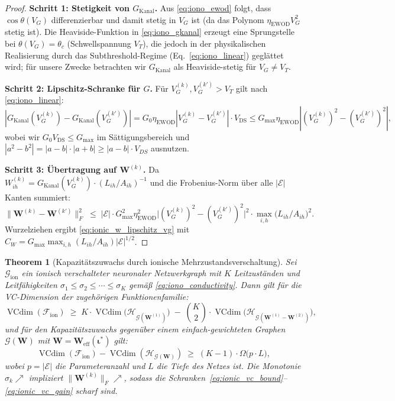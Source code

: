 \documentclass[12pt, a4paper, openany]{report}
\newtheorem{theorem}{Theorem}[chapter]
\newcommand{\calG}{\mathcal{G}}
\newcommand{\calH}{\mathcal{H}}
\newcommand{\calE}{\mathcal{E}}
\newcommand{\calF}{\mathcal{F}}
\DeclareMathOperator{\VC}{VCdim}
\begin{document}
\begin{proof}
\textbf{Schritt 1: Stetigkeit von $G_{\mathrm{Kanal}}$.}
Aus \eqref{eq:iono_ewod} folgt, dass $\cos\theta(V_G)$ differenzierbar
und damit stetig in $V_G$ ist (da das Polynom $\eta_{\mathrm{EWOD}} V_G^2$
stetig ist).  Die Heaviside-Funktion in \eqref{eq:iono_gkanal} erzeugt
eine Sprungstelle bei $\theta(V_G) = \theta_c$ (Schwellspannung $V_T$),
die jedoch in der physikalischen Realisierung durch das Subthreshold-Regime
(Eq.~\ref{eq:iono_linear}) geglättet wird; für unsere Zwecke betrachten
wir $G_{\mathrm{Kanal}}$ als Heaviside-stetig für $V_G \neq V_T$.

\textbf{Schritt 2: Lipschitz-Schranke für $G$.}
Für $V_G^{(k)}, V_G^{(k')} > V_T$ gilt nach \eqref{eq:iono_linear}:
\[
  |G_{\mathrm{Kanal}}(V_G^{(k)}) - G_{\mathrm{Kanal}}(V_G^{(k')})| 
  = G_0 \eta_{\mathrm{EWOD}} |V_G^{(k)} - V_G^{(k')}| \cdot V_\mathrm{DS}
  \leq G_{\max} \eta_{\mathrm{EWOD}} |(V_G^{(k)})^2 - (V_G^{(k')})^2|,
\]
wobei wir $G_0 V_\mathrm{DS} \leq G_{\max}$ im Sättigungsbereich
und $|a^2 - b^2| = |a-b| \cdot |a+b| \geq |a-b| \cdot V_{DS}$ ausnutzen.

\textbf{Schritt 3: Übertragung auf $\bm{W}^{(k)}$.}
Da $W^{(k)}_{ih} = G_{\mathrm{Kanal}}(V_G^{(k)}) \cdot (L_{ih}/A_{ih})^{-1}$
und die Frobenius-Norm über alle $|\calE|$ Kanten summiert:
\[
  \|\bm{W}^{(k)} - \bm{W}^{(k')}\|_F^2
  \;\leq\;
  |\calE| \cdot G_{\max}^2 \eta_{\mathrm{EWOD}}^2
  \bigl|(V_G^{(k)})^2 - (V_G^{(k')})^2\bigr|^2
  \cdot \max_{i,h}\bigl(L_{ih}/A_{ih}\bigr)^2.
\]
Wurzelziehen ergibt \eqref{eq:ionic_w_lipschitz_vg} mit
$C_W = G_{\max} \max_{i,h}(L_{ih}/A_{ih}) |\calE|^{1/2}$.
\end{proof}

\begin{theorem}[Kapazitätszuwachs durch ionische Mehrzustandsverschaltung]
\label{thm:ionic_capacity}
Sei $\calG_{\mathrm{ion}}$ ein ionisch verschalteter neuronaler Netzwerkgraph
mit $K$ Leitzuständen und Leitfähigkeiten $\sigma_1 \leq \sigma_2 \leq
\cdots \leq \sigma_K$ gemäß \eqref{eq:iono_conductivity}.
Dann gilt für die VC-Dimension der zugehörigen Funktionenfamilie:
\begin{equation}
  \label{eq:ionic_vc_bound}
  \VC(\calF_{\mathrm{ion}})
  \;\geq\;
  K \cdot \VC\!\bigl(\calH_{\calG(\bm{W}^{(1)})}\bigr)
  \;-\;
  \binom{K}{2} \cdot \VC\!\bigl(\calH_{\calG(\bm{W}^{(1)}\!-\!\bm{W}^{(2)})}\bigr),
\end{equation}
und für den Kapazitätszuwachs gegenüber einem einfach-gewichteten Graphen
$\calG(\bm{W})$ mit $\bm{W} = \bm{W}_{\mathrm{eff}}(\bm{\iota}^*)$ gilt:
\begin{equation}
  \label{eq:ionic_vc_gain}
  \VC(\calF_{\mathrm{ion}}) - \VC(\calH_{\calG(\bm{W})})
  \;\geq\;
  (K-1) \cdot \Omega\!\bigl(p \cdot L\bigr),
\end{equation}
wobei $p = |\calE|$ die Parameteranzahl und $L$ die Tiefe des Netzes ist.
Die Monotonie $\sigma_k \nearrow$ impliziert $\|\bm{W}^{(k)}\|_F \nearrow$,
sodass die Schranken~\eqref{eq:ionic_vc_bound}--\eqref{eq:ionic_vc_gain} scharf sind.
\end{theorem}
\end{document}
